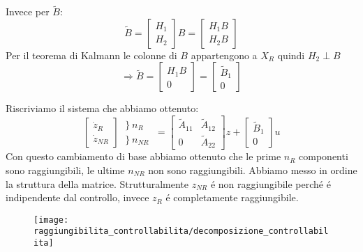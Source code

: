 \documentclass[../main.tex]{subfiles}
\begin{document}
		Invece per $ \tilde B $:
		\[
			\tilde B=
			\begin{bmatrix}
				H_1\\
				H_2
			\end{bmatrix} B =
			\begin{bmatrix}
				H_1 B\\
				H_2 B
			\end{bmatrix}
		\]
		Per il teorema di Kalmann le colonne di $ B $ appartengono a $ X_R $ quindi $ H_2 \perp B $
		\[
			\Rightarrow \tilde B =
			\begin{bmatrix}
				H_1 B\\
				0
			\end{bmatrix} =
			\begin{bmatrix}
					\tilde B_1\\
					0
			\end{bmatrix}
		\]
		
		Riscriviamo il sistema che abbiamo ottenuto:
		\[
			\begin{bmatrix}
				\dot z_R\\
				\dot z_{NR}
			\end{bmatrix}
			\begin{matrix}
				\left. \right\rbrace n_R \phantom{R}\\
				\left. \right\rbrace n_{NR}
			\end{matrix} =
			\begin{bmatrix}
				\tilde A_{11} & \tilde A_{12}\\
				0 & \tilde A_{22}
			\end{bmatrix} z +
			\begin{bmatrix}
				\tilde B_1\\
				0
			\end{bmatrix} u
		\]
		Con questo cambiamento di base abbiamo ottenuto che le prime $ n_R $ componenti sono raggiungibili, le ultime $ n_{NR} $ non sono raggiungibili. Abbiamo messo in ordine la struttura della matrice. Strutturalmente $ z_{NR} $ \'e non raggiungibile perch\'e \'e indipendente dal controllo, invece $ z_R $ \'e completamente raggiungibile.
		\begin{figure}[H]
			\centering\texttt{[image: raggiungibilita\_controllabilita/decomposizione\_controllabilita]}
		\end{figure}
		
\end{document}
